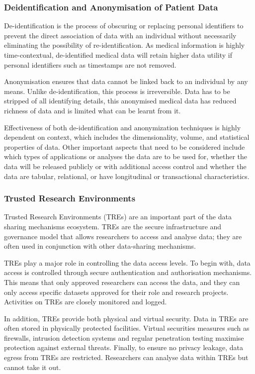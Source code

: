 \documentclass[11pt]{article}
\begin{document}
\subsubsection{Deidentification and Anonymisation of Patient Data}
De-identification is the process of obscuring or replacing personal identifiers to prevent the direct association of data with an individual without necessarily eliminating the possibility of re-identification. As medical information is highly time-contextual, de-identified medical data will retain higher data utility if personal identifiers such as timestamps are not removed.

Anonymisation ensures that data cannot be linked back to an individual by any means. Unlike de-identification, this process is irreversible. Data has to be stripped of all identifying details, this anonymised medical data has reduced richness of data and is limited what can be learnt from it. 

Effectiveness of both de-identification and anonymization techniques is highly dependent on context, which includes the dimensionality, volume, and statistical properties of data. Other important aspects that need to be considered include which types of applications or analyses the data are to be used for, whether the data will be released publicly or with additional access control and whether the data are tabular, relational, or have longitudinal or transactional characteristics.

\subsubsection{Trusted Research Environments}

Trusted Research Environments (TREs) are an important part of the data sharing mechanisms ecosystem. TREs are the secure infrastructure and governance model that allows researchers to access and analyse data; they are often used in conjunction with other data-sharing mechanisms.

TREs play a major role in controlling the data access levels. To begin with, data access is controlled through secure authentication and authorisation mechanisms. This means that only approved researchers can access the data, and they can only access specific datasets approved for their role and research projects. Activities on TREs are closely monitored and logged.

In addition, TREs provide both physical and virtual security. Data in TREs are often stored in physically protected facilities. Virtual securities  measures such as firewalls, intrusion detection systems and regular penetration testing maximise protection against external threats.  Finally, to ensure no privacy leakage, data egress from TREs are restricted. Researchers can analyse data within TREs but cannot take it out.
\end{document}
